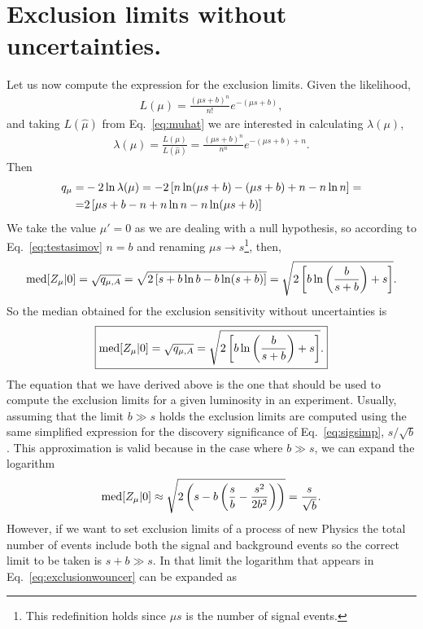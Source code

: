 \documentclass[12pt,a4paper]{article}
\begin{document}
\section{Exclusion limits without uncertainties.}
Let us now compute the expression for the exclusion limits. Given the likelihood,
\begin{align}
L(\mu) = \frac{(\mu s + b)^n}{n!}e^{-(\mu s + b)},
\end{align}
and taking $L(\hat{\mu})$ from Eq.~\eqref{eq:muhat} we are interested in calculating $\lambda(\mu)$,
\begin{align}
\lambda(\mu)=\frac{L(\mu)}{L(\hat{\mu})}=\frac{(\mu s+b)^n}{n^n}e^{-(\mu s+b)+n}.
\end{align}
Then
\begin{align}
q_\mu =& -2\ln\lambda(\mu)=-2\left[n\ln(\mu s +b)-(\mu s +b)+n-n\ln n\right]=\notag\\
=& 2\left[\mu s + b -n +n\ln n-n\ln(\mu s +b)\right]
\end{align}
We take the value $\mu'=0$ as we are dealing with a null hypothesis, so according to Eq.~\eqref{eq:testasimov} $n=b$ and renaming $\mu s\to s$\footnote{This redefinition holds since $\mu s$ is the number of signal events.}, then,
\begin{align}
{\rm med}[Z_\mu|0]=\sqrt{q_{\mu,A}}=\sqrt{2\left[s+b\ln b-b\ln(s+b)\right]}=\sqrt{2\left[b\ln\left(\frac{b}{s+b}\right)+s\right]}.
\end{align}
So the median obtained for the exclusion sensitivity without uncertainties is
\begin{align}
\boxed{{\rm med}[Z_\mu|0]=\sqrt{q_{\mu,A}}=\sqrt{2\left[b\ln\left(\frac{b}{s+b}\right)+s\right]}.}
\label{eq:exclusionwouncer}
\end{align}
The equation that we have derived above is the one that should be used to compute the exclusion limits for a given luminosity in an experiment. Usually, assuming that the limit $b\gg s$ holds the exclusion limits are computed using the same simplified expression for the discovery significance of Eq.~\eqref{eq:sigsimp}, $s/\sqrt{b}$. This approximation is valid because in the case where $b\gg s$, we can expand the logarithm
\begin{align}
{\rm med}[Z_\mu|0]\approx \sqrt{2\left(s-b\left(\frac{s}{b}-\frac{s^2}{2b^2}\right)\right)}=\frac{s}{\sqrt{b}}.
\end{align}
However, if we want to set exclusion limits of a process of new Physics the total number of events include both the signal and background events so the correct limit to be taken is $s+b\gg s$. In that limit the logarithm that appears in Eq.~\eqref{eq:exclusionwouncer} can be expanded as
\end{document}
